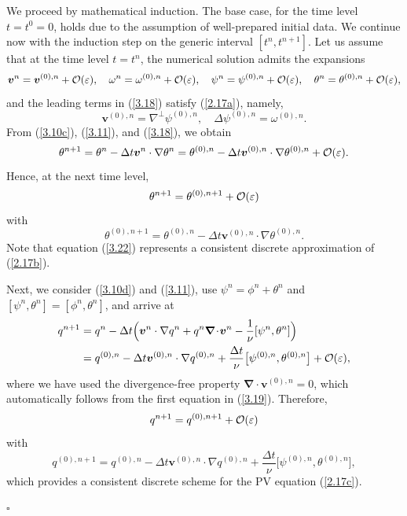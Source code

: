 \documentclass[a4paper,11pt,twoside]{article}
\newenvironment{proof}{{\flushleft \bf Proof:}}{\hfill$\square$\par}
\numberwithin{equation}{section}
\numberwithin{figure}{section}
\numberwithin{table}{section}
\newcommand{\bnabla}{\bm{\nabla}}
\newcommand{\eps}{\varepsilon}
\newcommand{\dt}{\Delta t}
\newcommand{\bv}{\bm{v}}
\newcommand\eref[1]{(\ref{#1})}
\newcommand{\RIIIcolor}[1]{{\leavevmode\color{magenta} #1}}
\begin{document}
\begin{proof}
We proceed by mathematical induction. 
%
\RIIIcolor{The base case, for the time level $t=t^0=0$, holds due to the assumption of well-prepared initial data. We continue now with the induction step on the generic interval $[t^n,t^{n+1}]$.}
Let us assume that at the time level
$t=t^n$, the numerical solution admits the expansions 
\begin{equation}
\bv^n=\bv^{(0),n}+{\cal O}(\eps),\quad\omega^n=\omega^{(0),n}+{\cal O}(\eps),\quad\psi^n=\psi^{(0),n}+{\cal O}(\eps),\quad 
\theta^n=\theta^{(0),n}+{\cal O}(\eps),
\label{3.18}
\end{equation}
and the leading terms in \eref{3.18} satisfy \eref{2.17a}, namely,
\begin{equation}
\bv^{(0),n}=\nabla^\perp\psi^{(0),n},\quad\Delta\psi^{(0),n}=\omega^{(0),n}.
\label{3.19}
\end{equation}
From \eref{3.10c}, \eref{3.11}, and \eref{3.18}, we obtain
\begin{equation*}
\theta^{n+1}=\theta^n-\dt\bv^n\cdot\nabla\theta^n=\theta^{(0),n}-\dt\bv^{(0),n}\cdot\nabla\theta^{(0),n}+{\cal O}(\eps). 
\end{equation*}
Hence, at the next time level,
\begin{equation}
\theta^{n+1}=\theta^{(0),n+1}+{\cal O}(\eps)
\label{3.21}
\end{equation}
with 
\begin{equation}
\theta^{(0),n+1}=\theta^{(0),n}-\dt\bv^{(0),n}\cdot\nabla\theta^{(0),n}.
\label{3.22}
\end{equation}
Note that equation \eref{3.22} represents a consistent discrete approximation of \eref{2.17b}. 
		
Next, we consider \eref{3.10d} and \eref{3.11}, use $\psi^n=\phi^n+\theta^n$ and $[\psi^n,\theta^n]=[\phi^n,\theta^n]$, and arrive at
\begin{equation*}
\begin{aligned}
q^{n+1}&=q^n-\dt\Big(\bv^n\cdot\nabla q^n+q^n\bnabla\!\cdot\!\bv^n-\frac{1}{\nu}[\psi^n,\theta^n]\Big)\\
&=q^{(0),n}-\dt\bv^{(0),n}\cdot\nabla q^{(0),n}+\frac{\dt}{\nu}\big[\psi^{(0),n},\theta^{(0),n}\big]+{\cal O}(\eps),
\end{aligned}
\end{equation*}
where we have used the divergence-free property $\bnabla\!\cdot\!\bv^{(0),n}=0$, which automatically follows from the first equation in 
\eref{3.19}. Therefore,
\begin{equation}
q^{n+1}=q^{(0),n+1}+{\cal O}(\eps)
\label{3.23}
\end{equation}
with
\begin{equation}
q^{(0),n+1}=q^{(0),n}-\dt\bv^{(0),n}\cdot\nabla q^{(0),n}+\frac{\dt}{\nu}\big[\psi^{(0),n},\theta^{(0),n}\big],
\label{3.24}
\end{equation}
which provides a consistent discrete scheme for the PV equation \eref{2.17c}.  


\end{proof}
\end{document}
